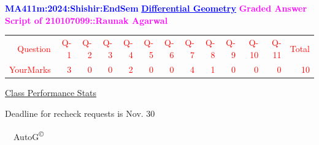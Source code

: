 \documentclass{article}                              %
\begin{document}
%
\vspace*{1in}

\begin{center}
	\textbf{\textcolor{blue}{\LARGE MA411m:2024:Shishir:EndSem}}
	\vskip 1cm
	\textbf{\textcolor{blue}{\underline{\Large Differential Geometry}}}
	\vskip 1cm
	\textbf{\textcolor{magenta}{\LARGE Graded Answer Script of 210107099::Raunak Agarwal}}
\end{center}


\begin{center}
	\Huge 
	\textcolor{red}{
	\begin{tabular}{*{13}{r}}
		Question&Q-1& Q-2& Q-3& Q-4& Q-5& Q-6& Q-7& Q-8& Q-9& Q-10& Q-11&Total  \\
        	YourMarks&3&0&0&2&0&0&4&1&0&0&0&10
	\end{tabular}
	}
        \vskip 2cm
	\large
	\underline{Class Performance Stats}
	\DTLsetseparator{;}
	\begin{table}[htbp]
		\centering
	\end{table}
	\vskip 1cm
	Deadline for recheck requests is Nov. 30
\end{center}
\ \vfill \ \hfill \small AutoG\textsuperscript{\copyright}
\newpage
%
\end{document}
